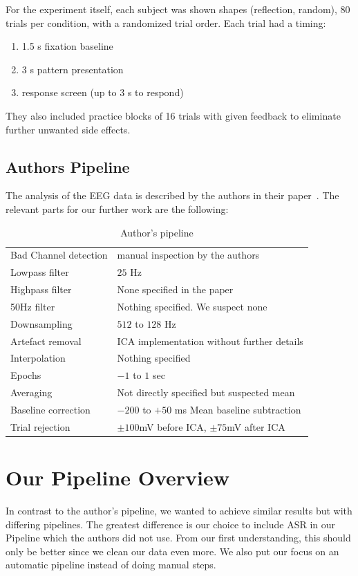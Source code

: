 \documentclass{scrartcl}
\begin{document}
For the experiment itself, each subject was shown shapes (reflection, random), 80 trials per condition, with a randomized trial order.
Each trial had a timing:
\begin{enumerate}
    \item 1.5 s fixation baseline
    \item 3 s pattern presentation
    \item response screen (up to 3 s to respond)
\end{enumerate}
They also included practice blocks of 16 trials with given feedback to eliminate further unwanted side effects.



\subsection{Authors Pipeline}
The analysis of the EEG data is described by the authors in their paper~\cite{paper}.
The relevant parts for our further work are the following:
\begin{table}[h]
    \centering
    \begin{tabular}{|l|l|}
    \hline
        Bad Channel detection & manual inspection by the authors \\
        Lowpass filter & $25$ Hz \\
        Highpass filter & None specified in the paper \\
        50Hz filter & Nothing specified. We suspect none \\
        Downsampling & $512$ to $128$ Hz \\
        Artefact removal & ICA implementation without further details \\
        Interpolation & Nothing specified \\
        Epochs & $-1$ to $1$ sec \\
        Averaging & Not directly specified but suspected mean \\
        Baseline correction & $-200$ to $+50$ ms Mean baseline subtraction \\
        Trial rejection & $\pm 100$mV before ICA, $\pm75$mV after ICA \\
        \hline
    \end{tabular}
    \caption{Author's pipeline}
\end{table}


\section{Our Pipeline Overview}\label{pipeline}
In contrast to the author's pipeline, we wanted to achieve similar results but with differing pipelines.
The greatest difference is our choice to include ASR in our Pipeline which the authors did not use.
From our first understanding, this should only be better since we clean our data even more.
We also put our focus on an automatic pipeline instead of doing manual steps.
\end{document}
